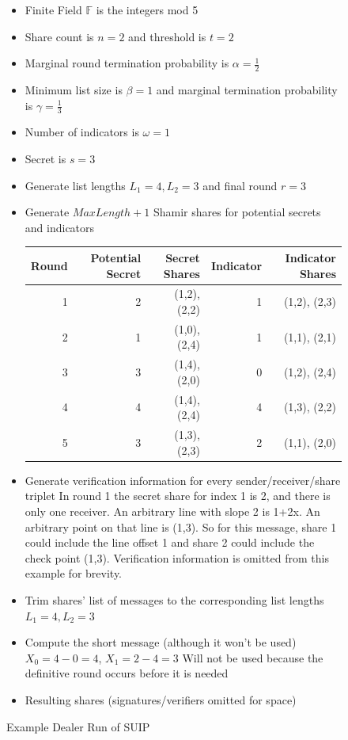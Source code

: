 \documentclass[12pt]{dalcsthesis}
\begin{document}
\begin{figure}
  \caption{Example Dealer Run of SUIP}
  \label{Ex:SUIP}
  \begin{itemize}
    \item Finite Field $\mathbb{F}$ is the integers mod 5
    \item Share count is $n = 2$ and threshold is $t = 2$
    \item Marginal round termination probability is $\alpha = \frac{1}{2}$
    \item Minimum list size is $\beta = 1$ and marginal termination probability is $\gamma = \frac{1}{3}$
    \item Number of indicators is $\omega = 1$
    \item Secret is $s = 3$
    \item Generate list lengths $L_1 = 4, L_2 = 3$ and final round $r = 3$
    \item Generate $MaxLength+1$ Shamir shares for potential secrets and indicators
  
      \begin{tabular}{|r|r|r|r|r|}
      \hline
        Round & Potential Secret & Secret Shares & Indicator & Indicator Shares \\
      \hline
        1 & 2  & (1,2), (2,2) & 1 & (1,2), (2,3) \\
      \hline
        2 & 1  & (1,0), (2,4) & 1 & (1,1), (2,1) \\
      \hline
        3 & 3  & (1,4), (2,0) & 0 & (1,2), (2,4) \\
      \hline
        4 & 4  & (1,4), (2,4) & 4 & (1,3), (2,2) \\
      \hline
        5 & 3  & (1,3), (2,3) & 2 & (1,1), (2,0) \\
      \hline
      \end{tabular}
      
    \item Generate verification information for every sender/receiver/share triplet
    \subitem In round 1 the secret share for index 1 is 2, and there is only one receiver. An arbitrary line with slope 2 is 1+2x. An arbitrary point on that line is (1,3). So for this message, share 1 could include the line offset 1 and share 2 could include the check point (1,3).
    \subitem Verification information is omitted from this example for brevity.
    
    \item Trim shares' list of messages to the corresponding list lengths $L_1 = 4, L_2 = 3$
    \item Compute the short message (although it won't be used)
    \subitem $X_0 = 4 - 0 = 4$, $X_1 = 2 - 4 = 3$
    \subitem Will not be used because the definitive round occurs before it is needed
    \item Resulting shares (signatures/verifiers omitted for space)
    

\end{itemize}
\end{figure}
\end{document}
